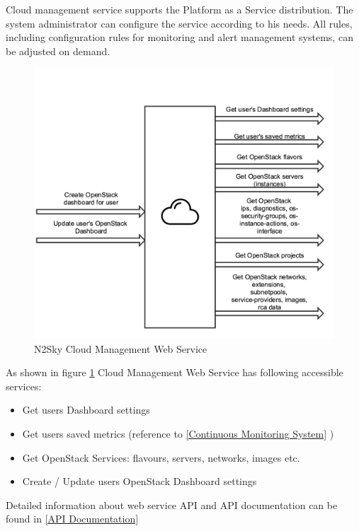 Cloud management service supports the Platform as a Service distribution. The system administrator can configure the service according to his needs. All rules, including configuration rules for monitoring and alert management systems, can be adjusted on demand.  
 
 
\begin{figure}[htbp]
\begin{center}
  \includegraphics[width=\linewidth]{components/3/components/cloud_service.png}
  \caption{N2Sky Cloud Management Web Service}
  \label{fig:cloud_service}
\end{center}
\end{figure}

 
 As shown in figure \ref{fig:cloud_service} Cloud Management Web Service has following accessible services:

\begin{itemize}
\item Get users Dashboard settings
\item Get users saved metrics (reference to \autoref{Continuous Monitoring System} )
\item Get OpenStack Services: flavours, servers, networks, images etc.
\item Create / Update users OpenStack Dashboard settings
\end{itemize}

Detailed information about web service API and API documentation can be found in \autoref{API Documentation}


